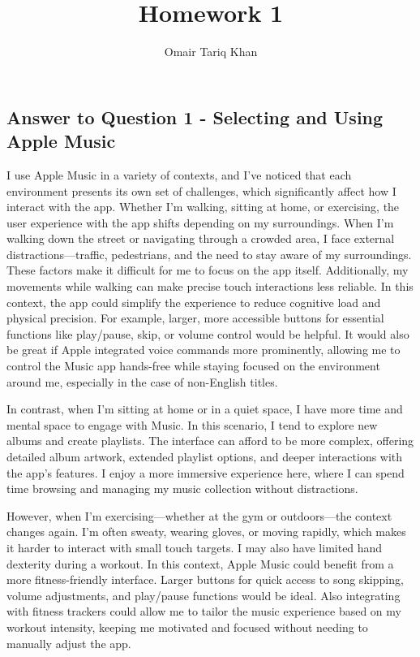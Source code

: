 \documentclass[
	letterpaper, %
]{jdf}
\author{Omair Tariq Khan}
\title{Homework 1}
\begin{document}

\maketitle
\newpage


\subsection{Answer to Question 1 - Selecting and Using Apple Music}
I use Apple Music in a variety of contexts, and I've noticed that each environment presents its own set of challenges, which significantly affect how I interact with the app. Whether I’m walking, sitting at home, or exercising, the user experience with the app shifts depending on my surroundings. When I’m walking down the street or navigating through a crowded area, I face external distractions—traffic, pedestrians, and the need to stay aware of my surroundings. These factors make it difficult for me to focus on the app itself. Additionally, my movements while walking can make precise touch interactions less reliable. In this context, the app could simplify the experience to reduce cognitive load and physical precision. For example, larger, more accessible buttons for essential functions like play/pause, skip, or volume control would be helpful. It would also be great if Apple integrated voice commands more prominently, allowing me to control the Music app hands-free while staying focused on the environment around me, especially in the case of non-English titles. 

In contrast, when I’m sitting at home or in a quiet space, I have more time and mental space to engage with Music. In this scenario, I tend to explore new albums and create playlists. The interface can afford to be more complex, offering detailed album artwork, extended playlist options, and deeper interactions with the app’s features. I enjoy a more immersive experience here, where I can spend time browsing and managing my music collection without distractions. 

However, when I’m exercising—whether at the gym or outdoors—the context changes again. I’m often sweaty, wearing gloves, or moving rapidly, which makes it harder to interact with small touch targets. I may also have limited hand dexterity during a workout. In this context, Apple Music could benefit from a more fitness-friendly interface. Larger buttons for quick access to song skipping, volume adjustments, and play/pause functions would be ideal. Also integrating with fitness trackers could allow me to tailor the music experience based on my workout intensity, keeping me motivated and focused without needing to manually adjust the app.
\end{document}
